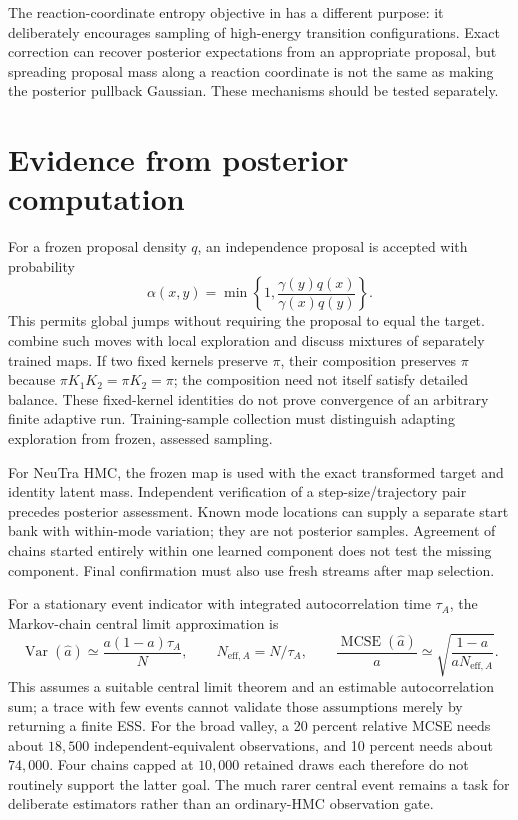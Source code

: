 The reaction-coordinate entropy objective in
\citet{noe2019boltzmanngenerators} has a different purpose: it deliberately
encourages sampling of high-energy transition configurations. Exact correction
can recover posterior expectations from an appropriate proposal, but spreading
proposal mass along a reaction coordinate is not the same as making the
posterior pullback Gaussian. These mechanisms should be tested separately.

\section[Sampling and confirmation]{Evidence from posterior computation}

For a frozen proposal density $q$, an independence proposal is accepted with
probability
\begin{equation}
 \alpha(x,y)=\min\left\{1,\frac{\gamma(y)q(x)}{\gamma(x)q(y)}\right\}.
\end{equation}
This permits global jumps without requiring the proposal to equal the target.
\citet{gabrie2022adaptiveflows} combine such moves with local exploration and
discuss mixtures of separately trained maps. If two fixed kernels preserve
$\pi$, their composition preserves $\pi$ because $\pi K_1K_2=\pi K_2=\pi$;
the composition need not itself satisfy detailed balance. These fixed-kernel
identities do not prove convergence of an arbitrary finite adaptive run.
Training-sample collection must distinguish adapting exploration from frozen,
assessed sampling.

For NeuTra HMC, the frozen map is used with the exact transformed target and
identity latent mass. Independent verification of a step-size/trajectory pair
precedes posterior assessment. Known mode locations can supply a separate
start bank with within-mode variation; they are not posterior samples. Agreement
of chains started entirely within one learned component does not test the
missing component. Final confirmation must also use fresh streams after map
selection.

For a stationary event indicator with integrated autocorrelation time $\tau_A$,
the Markov-chain central limit approximation is
\begin{equation}
 \operatorname{Var}(\widehat a)\simeq\frac{a(1-a)\tau_A}{N},\qquad
 N_{\mathrm{eff},A}=N/\tau_A,
 \qquad
 \frac{\operatorname{MCSE}(\widehat a)}{a}
 \simeq\sqrt{\frac{1-a}{aN_{\mathrm{eff},A}}}.
 \label{eq:controlled-event-precision}
\end{equation}
This assumes a suitable central limit theorem and an estimable autocorrelation
sum; a trace with few events cannot validate those assumptions merely by
returning a finite ESS. For the broad valley, a 20 percent relative MCSE needs
about $18{,}500$ independent-equivalent observations, and 10 percent needs about
$74{,}000$. Four chains capped at $10{,}000$ retained draws each therefore do
not routinely support the latter goal. The much rarer central event remains
a task for deliberate estimators rather than an ordinary-HMC observation gate.

